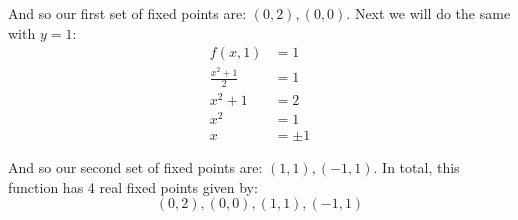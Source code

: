 \documentclass{article}
\begin{document}
And so our first set of fixed points are: $(0,2), (0,0)$. Next we will do the same with $y=1$:
\begin{align*}
  f(x,1)&=1\\
  \frac{x^2+1}{2}&=1\\
  x^2+1&=2\\
  x^2&=1\\
  x&=\pm1
\end{align*}

And so our second set of fixed points are: $(1,1), (-1,1)$. In total, this function has 4 real fixed points given by:
$$(0,2), (0,0), (1,1), (-1,1)$$
\end{document}

